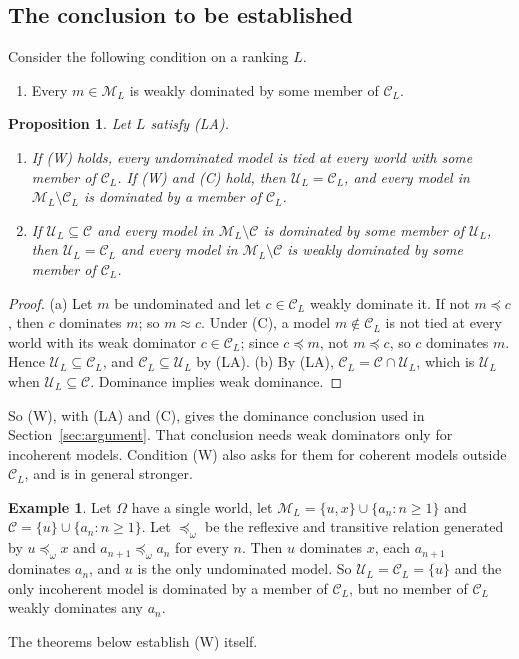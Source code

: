 \documentclass[11pt]{article}
\newtheorem{proposition}[theorem]{Proposition}
\theoremstyle{definition}
\newtheorem{example}[theorem]{Example}
\theoremstyle{remark}
\newcommand{\M}{\mathcal M}
\newcommand{\C}{\mathcal C}
\newcommand{\U}{\mathcal U}
\begin{document}
\subsection{The conclusion to be established}\label{sec:W}
Consider the following condition on a ranking $L$.
\begin{enumerate}[label=\textbf{(W)},leftmargin=*]
\item Every $m\in\M_L$ is weakly dominated by some member of $\C_L$.
\end{enumerate}
\begin{proposition}\label{prop:W}
Let $L$ satisfy (LA).
\begin{enumerate}[label=(\alph*)]
\item If (W) holds, every undominated model is tied at every world with some member of $\C_L$. If (W) and (C) hold, then $\U_L=\C_L$, and every model in $\M_L\setminus\C_L$ is dominated by a member of $\C_L$.
\item If $\U_L\subseteq\C$ and every model in $\M_L\setminus\C$ is dominated by some member of $\U_L$, then $\U_L=\C_L$ and every model in $\M_L\setminus\C$ is weakly dominated by some member of $\C_L$.
\end{enumerate}
\end{proposition}
\begin{proof}
(a) Let $m$ be undominated and let $c\in\C_L$ weakly dominate it. If not $m\preceq c$, then $c$ dominates $m$; so $m\approx c$. Under (C), a model $m\notin\C_L$ is not tied at every world with its weak dominator $c\in\C_L$; since $c\preceq m$, not $m\preceq c$, so $c$ dominates $m$. Hence $\U_L\subseteq\C_L$, and $\C_L\subseteq\U_L$ by (LA). (b) By (LA), $\C_L=\C\cap\U_L$, which is $\U_L$ when $\U_L\subseteq\C$. Dominance implies weak dominance.
\end{proof}
So (W), with (LA) and (C), gives the dominance conclusion used in Section~\ref{sec:argument}. That conclusion needs weak dominators only for incoherent models. Condition (W) also asks for them for coherent models outside $\C_L$, and is in general stronger.
\begin{example}\label{ex:W-strong}
Let $\Omega$ have a single world, let $\M_L=\{u,x\}\cup\{a_n:n\ge1\}$ and $\C=\{u\}\cup\{a_n:n\ge1\}$. Let $\preceq_\omega$ be the reflexive and transitive relation generated by $u\preceq_\omega x$ and $a_{n+1}\preceq_\omega a_n$ for every $n$. Then $u$ dominates $x$, each $a_{n+1}$ dominates $a_n$, and $u$ is the only undominated model. So $\U_L=\C_L=\{u\}$ and the only incoherent model is dominated by a member of $\C_L$, but no member of $\C_L$ weakly dominates any $a_n$.
\end{example}
The theorems below establish (W) itself.
\end{document}
